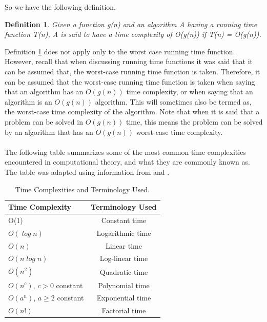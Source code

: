 \documentclass[12pt]{article}
\newtheorem{definition}{Definition}[subsection]
\numberwithin{equation}{subsection}
\numberwithin{table}{subsection}
\begin{document}
So we have the following definition.
\begin{definition}
\label{time_complexity}
Given a function g(n) and an algorithm A having a running time function T(n), A is said to have a time complexity of O(g(n)) if T(n) = O(g(n)).  
\end{definition}
Definition \ref{time_complexity} does not apply only to the worst case running time function. However, recall that when discussing running time functions it was said that it can be assumed that, the worst-case running time function is taken. Therefore, it can be assumed that the worst-case running time function is taken when saying that an algorithm has an $\mathit{O(g(n))}$ time complexity, or when saying that an algorithm is an $\mathit{O(g(n))}$ algorithm. This will sometimes also be termed as, the worst-case time complexity of the algorithm. Note that when it is said that a problem can be solved in $\mathit{O(g(n))}$ time, this means the problem can be solved by an algorithm that has an $\mathit{O(g(n))}$ worst-case time complexity.\\\\
The following table summarizes some of the most common time complexities encountered in computational theory, and what they are commonly known as. The table was adapted using information from \cite{big_o_notation_explained} and \cite{carter_1999}.
\begin{table}[!htbp]
  \begin{center}
    \caption{Time Complexities and Terminology Used.}
    \label{tab:table1}
    \begin{tabular}{l|c} %
      \textbf{Time Complexity} & \textbf{Terminology Used}\\
      \hline
      O(1)                          & Constant time    \\
     $O(\mathit{\log n})$          & Logarithmic time \\
     $O(\mathit{n})$               & Linear time      \\
     $O(\mathit{n \log n})$        & Log-linear time  \\
     $O(\mathit{n^2})$             & Quadratic time   \\
     $O(\mathit{n^c})$, $\mathit{c > 0}$ constant & Polynomial time  \\
     $O(\mathit{a^n})$, $\mathit{a \geq 2}$ constant & Exponential time \\
     $O(\mathit{n!})$              & Factorial time
    \end{tabular}
  \end{center}
\end{table}
\end{document}
